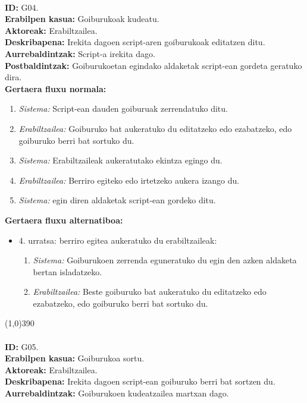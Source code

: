 \newpage
\noindent\\
\textbf{ID:} G04.\\
\textbf{Erabilpen kasua:} Goiburukoak kudeatu.\\
\textbf{Aktoreak:} Erabiltzailea.\\
\textbf{Deskribapena:} Irekita dagoen script-aren goiburukoak editatzen ditu.\\
\textbf{Aurrebaldintzak:} Script-a irekita dago.\\
\textbf{Postbaldintzak:} Goiburukoetan egindako aldaketak script-ean gordeta geratuko dira.\\
\textbf{Gertaera fluxu normala:}
\begin{enumerate}
	\item \textit{Sistema:} Script-ean dauden goiburuak zerrendatuko ditu.
	\item \textit{Erabiltzailea:} Goiburuko bat aukeratuko du editatzeko edo ezabatzeko, edo goiburuko berri bat sortuko du.
	\item \textit{Sistema:} Erabiltzaileak aukeratutako ekintza egingo du.
	\item \textit{Erabiltzailea:} Berriro egiteko edo irtetzeko aukera izango du.
	\item \textit{Sistema:} egin diren aldaketak script-ean gordeko ditu.
\end{enumerate}
\textbf{Gertaera fluxu alternatiboa:}
\begin{itemize}
	\item 4. urratsa: berriro egitea aukeratuko du erabiltzaileak:
		\begin{enumerate}
		\item \textit{Sistema:} Goiburukoen zerrenda eguneratuko du egin den azken aldaketa bertan isladatzeko.
		\item \textit{Erabiltzailea:} Beste goiburuko bat aukeratuko du editatzeko edo ezabatzeko, edo goiburuko berri bat sortuko du.
		\end{enumerate}
\end{itemize}
\line(1,0){390}\\
\noindent\\
\textbf{ID:} G05.\\
\textbf{Erabilpen kasua:} Goiburukoa sortu.\\
\textbf{Aktoreak:} Erabiltzailea.\\
\textbf{Deskribapena:} Irekita dagoen script-ean goiburuko berri bat sortzen du.\\
\textbf{Aurrebaldintzak:} Goiburukoen kudeatzailea martxan dago.\\
